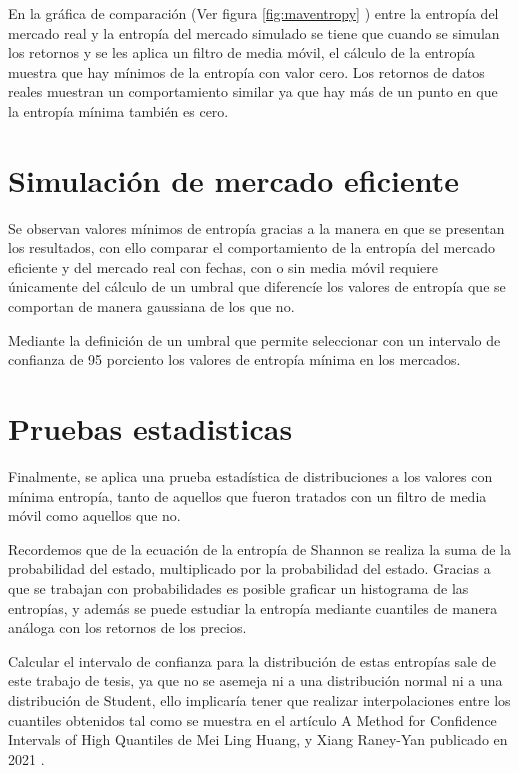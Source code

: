 En la gráfica de comparación (Ver figura \ref{fig:maventropy} ) entre la entropía del mercado real y la entropía del mercado simulado se tiene que cuando se simulan los retornos y se les aplica un filtro de media móvil, el cálculo de la entropía muestra que hay mínimos de la entropía con valor cero. Los retornos de datos reales muestran un comportamiento similar ya que hay más de un punto en que la entropía mínima también es cero.

\section{Simulación de mercado eficiente}
Se observan valores mínimos de entropía gracias a la manera en que se presentan los resultados, 
con ello comparar el comportamiento de la entropía del mercado eficiente y del mercado real con fechas, 
con o sin media móvil requiere únicamente del cálculo de un umbral que diferencíe los valores de entropía que se comportan de manera gaussiana  de los que no.

Mediante la definición de un umbral que permite seleccionar con un intervalo de confianza de 95 porciento los valores de entropía mínima en los mercados. 


\section{Pruebas estadisticas}

Finalmente, se aplica una prueba estadística de distribuciones a los valores con mínima entropía, tanto de aquellos que fueron tratados con un filtro de media móvil como aquellos que no. 

Recordemos que de la ecuación de la entropía de Shannon se realiza la suma de la probabilidad del estado, multiplicado por la probabilidad del estado. Gracias a que se trabajan con probabilidades es posible graficar un histograma de las entropías, y además se puede estudiar la entropía mediante cuantiles de manera análoga con los retornos de los precios.

Calcular el intervalo de confianza para la distribución de estas entropías sale de este trabajo de tesis, ya que no se asemeja ni a una distribución normal ni a una distribución de Student, ello implicaría tener que realizar interpolaciones entre los cuantiles obtenidos tal como se muestra en el artículo A Method for Confidence Intervals of High Quantiles de Mei Ling Huang, y Xiang Raney-Yan publicado en 2021 \citep[][]{Huang2021}. 

